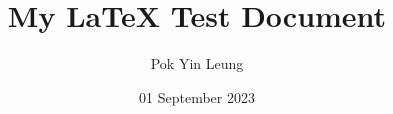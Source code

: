 

\title{My LaTeX Test Document}
\author{Pok Yin Leung}
\date{01 September 2023}




\renewcommand{\labelitemi}{\raisebox{.10ex}{\large$\bullet$}}
\renewcommand{\labelitemii}{{\raisebox{.40ex}{\rule{.6ex}{.6ex}}}}
\renewcommand{\labelitemiii}{{\large$\triangleright$}}

\maketitle















\printbibliography


